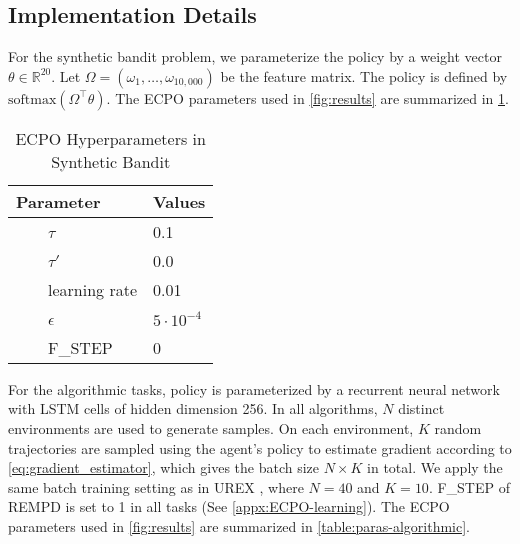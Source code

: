 \subsection{Implementation Details}
\label{subsec:implementation}
For the synthetic bandit problem, we parameterize the policy by a weight vector $\theta\in  \mathbb{R}^{20}$. Let $\Omega = \left( \omega_1, \dots, \omega_{10,000} \right)$ be the feature matrix. The policy is defined by $\text{softmax}(\Omega^{\top}\theta)$. The ECPO parameters used in \cref{fig:results} are summarized in \cref{table:paras-bandit}. 
\begin{table}[ht]
\caption{ECPO Hyperparameters in Synthetic Bandit} %
\centering 
\begin{tabular}{l l} 
\hline
Parameter & Values \\ [0.5ex] %
\hline %
\ \ \ \ $\tau$ & 0.1  \\
\ \ \ \ $\tau'$ & 0.0 \\
\ \ \ \ learning rate & 0.01 \\
\ \ \ \ $\epsilon $ & $5\cdot 10^{-4}$ \\
\ \ \ \ F\_STEP & 0 \\
\hline
\end{tabular}
\label{table:paras-bandit} %
\end{table}


For the algorithmic tasks, policy is parameterized by a recurrent neural network with LSTM cells of hidden dimension 256.
In all algorithms, $N$ distinct environments are used to generate samples. On each environment, $K$ random trajectories are sampled using the agent's policy to estimate gradient according to \cref{eq:gradient_estimator}, which gives the batch size $N\times K$ in total. We apply the same batch training setting as in UREX \citep{nachum2017improving}, where $N=40$ and $K=10$. F\_STEP of REMPD is set to 1 in all tasks (See \cref{appx:ECPO-learning}). The ECPO parameters used in \cref{fig:results} are summarized in \cref{table:paras-algorithmic}. 


